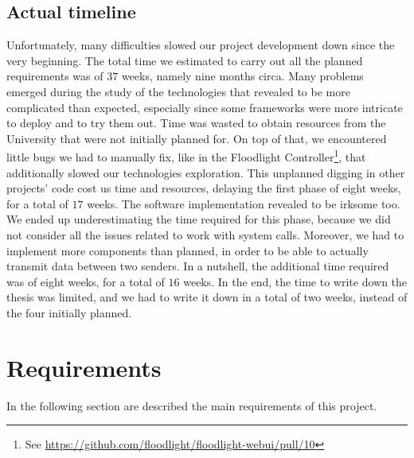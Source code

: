 \subsection{Actual timeline}
Unfortunately, many difficulties slowed our project development down since the
very beginning. The total time we estimated to carry out all the planned
requirements was of $37$ weeks, namely nine months circa. Many problems emerged
during the study of the technologies that revealed to be more complicated than
expected, especially since some frameworks were more intricate to deploy and to
try them out. Time was wasted to obtain resources from the University that were
not initially planned for. On top of that, we encountered little bugs we had to
manually fix, like in the Floodlight
Controller\footnote{See \url{https://github.com/floodlight/floodlight-webui/pull/10}},
that additionally slowed our technologies exploration. This unplanned digging
in other projects' code cost us time and resources, delaying the first phase of
eight
weeks, for a total of $17$ weeks. The software implementation revealed to be
irksome too. We ended up underestimating the time required for this phase,
because
we did not consider all the issues related to work with system calls. Moreover,
we had to implement more components than planned, in order to be able to
actually transmit data between two senders. In a nutshell, the additional time
required was of eight weeks, for a total of $16$ weeks. In the end, the time to
write
down the thesis was limited, and we had to write it down in a
total of two weeks, instead of the four initially planned.

\section{Requirements}\label{chap:prjan:sec:req}
In the following section are described the main requirements of this project.

